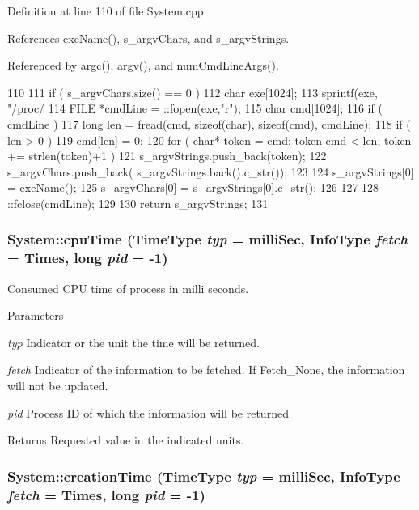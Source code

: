 Definition at line 110 of file System.cpp.

References exeName(), s\_\-argvChars, and s\_\-argvStrings.

Referenced by argc(), argv(), and numCmdLineArgs().


\begin{DoxyCode}
110                                                   {
111   if ( s_argvChars.size() == 0 )    {
112     char exe[1024];
113     sprintf(exe, "/proc/%
114     FILE *cmdLine = ::fopen(exe,"r");
115     char cmd[1024];
116     if ( cmdLine )   {
117       long len = fread(cmd, sizeof(char), sizeof(cmd), cmdLine);
118       if ( len > 0 )   {
119         cmd[len] = 0;
120         for ( char* token = cmd; token-cmd < len; token += strlen(token)+1 )  {
121           s_argvStrings.push_back(token);
122           s_argvChars.push_back( s_argvStrings.back().c_str());
123         }
124         s_argvStrings[0] = exeName();
125         s_argvChars[0]   = s_argvStrings[0].c_str();
126       }
127     }
128     ::fclose(cmdLine);
129   }
130   return s_argvStrings;
131 }
\end{DoxyCode}
\hypertarget{namespaceSystem_ada4da1a560bc9a436b2b04d3a15cd655}{
\subsubsection[{cpuTime}]{ System::cpuTime (TimeType {\em typ} = {\ttfamily milliSec}, \/  InfoType {\em fetch} = {\ttfamily Times}, \/  long {\em pid} = {\ttfamily -\/1})}}
\label{namespaceSystem_ada4da1a560bc9a436b2b04d3a15cd655}
Consumed CPU time of process in milli seconds. 
\begin{DoxyParams}{Parameters}
\item[{\em typ}]Indicator or the unit the time will be returned. \item[{\em fetch}]Indicator of the information to be fetched. If Fetch\_\-None, the information will not be updated. \item[{\em pid}]Process ID of which the information will be returned \end{DoxyParams}
\begin{DoxyReturn}{Returns}
Requested value in the indicated units. 
\end{DoxyReturn}
\hypertarget{namespaceSystem_a90888edb3659d54b56e8c9744357202e}{
\subsubsection[{creationTime}]{ System::creationTime (TimeType {\em typ} = {\ttfamily milliSec}, \/  InfoType {\em fetch} = {\ttfamily Times}, \/  long {\em pid} = {\ttfamily -\/1})}}

